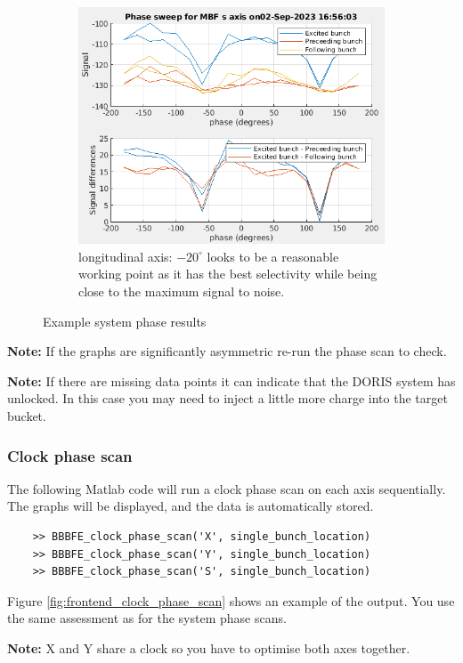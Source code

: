 \documentclass{report}
\begin{document}
\begin{figure}[hbt]
    \begin{subfigure}[b]{0.45\textwidth}
        \includegraphics[width=\textwidth]{vlr_system_phase_scan_s.png}
        \caption{longitudinal axis: $-20^\circ$ looks to be a reasonable working point as it has the best selectivity while being close to the maximum signal to noise.}
        \label{fig:frontend_system_phase_scan_z}
    \end{subfigure}
    \caption{Example system phase results}
    \label{fig:frontend_system_phase_scan}
\end{figure}
\begin{tcolorbox}
\textbf{Note: }If the graphs are significantly asymmetric re-run the phase scan to check.

\textbf{Note:} If there are missing data points it can indicate that the DORIS system has unlocked. In this case you may need to inject a little more charge into the target bucket.
\end{tcolorbox}

\subsubsection{Clock phase scan} 
The following Matlab code will run a clock phase scan on each axis sequentially. The graphs will be displayed, and the data is automatically stored. 

\begin{verbatim}
    >> BBBFE_clock_phase_scan('X', single_bunch_location)
    >> BBBFE_clock_phase_scan('Y', single_bunch_location)
    >> BBBFE_clock_phase_scan('S', single_bunch_location)
\end{verbatim}
Figure \ref{fig:frontend_clock_phase_scan} shows an example of the output. You use the same assessment as for the system phase scans.
\begin{tcolorbox}
\textbf{Note:} X and Y share a clock so you have to optimise both axes together.
\end{tcolorbox}
\end{document}
